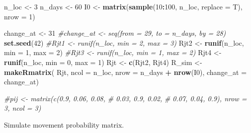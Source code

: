 \documentclass[11pt,]{article}
\newenvironment{Shaded}{\begin{snugshade}}{\end{snugshade}}
\newcommand{\KeywordTok}[1]{\textcolor[rgb]{0.13,0.29,0.53}{\textbf{#1}}}
\newcommand{\DataTypeTok}[1]{\textcolor[rgb]{0.13,0.29,0.53}{#1}}
\newcommand{\DecValTok}[1]{\textcolor[rgb]{0.00,0.00,0.81}{#1}}
\newcommand{\StringTok}[1]{\textcolor[rgb]{0.31,0.60,0.02}{#1}}
\newcommand{\CommentTok}[1]{\textcolor[rgb]{0.56,0.35,0.01}{\textit{#1}}}
\newcommand{\OperatorTok}[1]{\textcolor[rgb]{0.81,0.36,0.00}{\textbf{#1}}}
\newcommand{\NormalTok}[1]{#1}
\begin{document}
\begin{Shaded}
\begin{Highlighting}[]
\NormalTok{n_loc  <-}\StringTok{ }\DecValTok{3}
\NormalTok{n_days <-}\StringTok{ }\DecValTok{60}
\NormalTok{I0     <-}\StringTok{ }\KeywordTok{matrix}\NormalTok{(}\KeywordTok{sample}\NormalTok{(}\DecValTok{10}\OperatorTok{:}\DecValTok{100}\NormalTok{, n_loc, }\DataTypeTok{replace =}\NormalTok{ T),}
                 \DataTypeTok{nrow =} \DecValTok{1}\NormalTok{)}


\NormalTok{change_at <-}\StringTok{ }\DecValTok{31}
\CommentTok{#change_at <- seq(from = 29, to = n_days, by = 28)}
\KeywordTok{set.seed}\NormalTok{(}\DecValTok{42}\NormalTok{)}
\CommentTok{#Rjt1 <- runif(n_loc, min = 2, max = 3) }
\NormalTok{Rjt2 <-}\StringTok{ }\KeywordTok{runif}\NormalTok{(n_loc, }\DataTypeTok{min =} \DecValTok{1}\NormalTok{, }\DataTypeTok{max =} \DecValTok{2}\NormalTok{)}
\CommentTok{#Rjt3 <- runif(n_loc, min = 1, max = 2)}
\NormalTok{Rjt4 <-}\StringTok{ }\KeywordTok{runif}\NormalTok{(n_loc, }\DataTypeTok{min =} \DecValTok{0}\NormalTok{, }\DataTypeTok{max =} \DecValTok{1}\NormalTok{)}
\NormalTok{Rjt  <-}\StringTok{ }\KeywordTok{c}\NormalTok{(Rjt2, Rjt4)}
\NormalTok{R_sim  <-}\StringTok{ }\KeywordTok{makeRmatrix}\NormalTok{( Rjt,}
                       \DataTypeTok{ncol =}\NormalTok{ n_loc,}
                       \DataTypeTok{nrow =}\NormalTok{ n_days }\OperatorTok{+}\StringTok{ }\KeywordTok{nrow}\NormalTok{(I0),}
                       \DataTypeTok{change_at =}\NormalTok{ change_at)}

\CommentTok{#pij <- matrix(c(0.9, 0.06, 0.08,}
\CommentTok{#                0.03, 0.9, 0.02,}
\CommentTok{#                0.07, 0.04, 0.9), nrow = 3, ncol = 3)}
\end{Highlighting}
\end{Shaded}

Simulate movement probability matrix.
\end{document}

